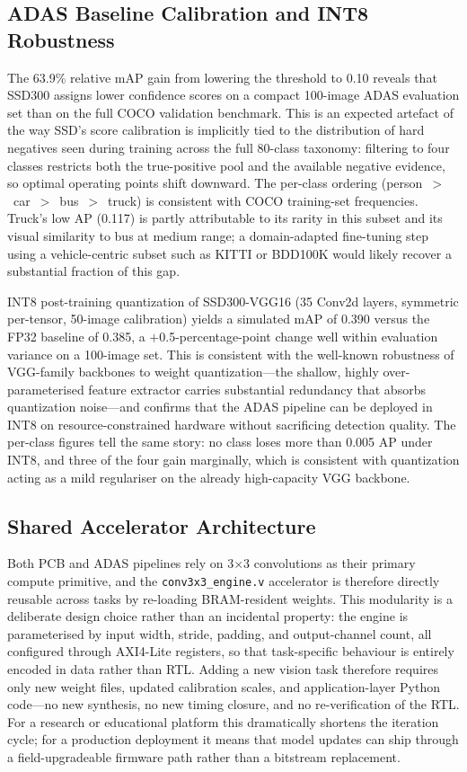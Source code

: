 \documentclass[conference]{IEEEtran}
\begin{document}
\subsection{ADAS Baseline Calibration and INT8 Robustness}

The 63.9\% relative mAP gain from lowering the threshold to 0.10 reveals that SSD300 assigns lower confidence scores on a compact 100-image ADAS evaluation set than on the full COCO validation benchmark. This is an expected artefact of the way SSD's score calibration is implicitly tied to the distribution of hard negatives seen during training across the full 80-class taxonomy: filtering to four classes restricts both the true-positive pool and the available negative evidence, so optimal operating points shift downward. The per-class ordering (person~$>$~car~$>$~bus~$>$~truck) is consistent with COCO training-set frequencies. Truck's low AP (0.117) is partly attributable to its rarity in this subset and its visual similarity to bus at medium range; a domain-adapted fine-tuning step using a vehicle-centric subset such as KITTI or BDD100K would likely recover a substantial fraction of this gap.

INT8 post-training quantization of SSD300-VGG16 (35 Conv2d layers, symmetric per-tensor, 50-image calibration) yields a simulated mAP of 0.390 versus the FP32 baseline of 0.385, a $+$0.5-percentage-point change well within evaluation variance on a 100-image set. This is consistent with the well-known robustness of VGG-family backbones to weight quantization---the shallow, highly over-parameterised feature extractor carries substantial redundancy that absorbs quantization noise---and confirms that the ADAS pipeline can be deployed in INT8 on resource-constrained hardware without sacrificing detection quality. The per-class figures tell the same story: no class loses more than 0.005 AP under INT8, and three of the four gain marginally, which is consistent with quantization acting as a mild regulariser on the already high-capacity VGG backbone.

\subsection{Shared Accelerator Architecture}

Both PCB and ADAS pipelines rely on 3$\times$3 convolutions as their primary compute primitive, and the \texttt{conv3x3\_engine.v} accelerator is therefore directly reusable across tasks by re-loading BRAM-resident weights. This modularity is a deliberate design choice rather than an incidental property: the engine is parameterised by input width, stride, padding, and output-channel count, all configured through AXI4-Lite registers, so that task-specific behaviour is entirely encoded in data rather than RTL. Adding a new vision task therefore requires only new weight files, updated calibration scales, and application-layer Python code---no new synthesis, no new timing closure, and no re-verification of the RTL. For a research or educational platform this dramatically shortens the iteration cycle; for a production deployment it means that model updates can ship through a field-upgradeable firmware path rather than a bitstream replacement.
\end{document}
